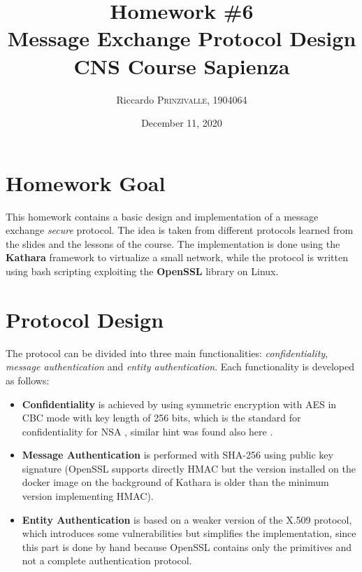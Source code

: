 \documentclass{article}
\title{Homework \#6 \\Message Exchange Protocol Design \\[0.2em]\small{}CNS Course Sapienza} %
\author{Riccardo \textsc{Prinzivalle}, 1904064} %
\date{December 11, 2020} %
\begin{document}
\maketitle %


\section{Homework Goal}

This homework contains a basic design and implementation of a message exchange \textit{secure} protocol. The idea is taken from different protocols learned from the slides and the lessons of the course. The implementation is done using the \textbf{Kathara} framework to virtualize a small network, while the protocol is written using bash scripting exploiting the \textbf{OpenSSL} library on Linux.


\section{Protocol Design}
\label{sec:design}

The protocol can be divided into three main functionalities: \textit{confidentiality}, \textit{message authentication} and \textit{entity authentication}. Each functionality is developed as follows:

\begin{itemize}
	\item \textbf{Confidentiality} is achieved by using symmetric encryption with AES in CBC mode with key length of 256 bits, which is the standard for confidentiality for NSA \cite{AES_NSA}, similar hint was found also here \cite{AES_stack}.
	\item \textbf{Message Authentication} is performed with SHA-256 using public key signature (OpenSSL supports directly HMAC but the version installed on the docker image on the background of Kathara is older than the minimum version implementing HMAC).
	\item \textbf{Entity Authentication} is based on a weaker version of the X.509 protocol, which introduces some vulnerabilities but simplifies the implementation, since this part is done by hand because OpenSSL contains only the primitives and not a complete authentication protocol. 
\end{itemize}
\end{document}
